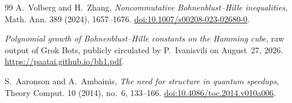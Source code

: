 \documentclass[11pt]{amsart}
\theoremstyle{remark}
\numberwithin{equation}{section}
\begin{document}
\begin{thebibliography}{99}
A.~Volberg and H.~Zhang,
\emph{Noncommutative Bohnenblust--Hille inequalities},
Math. Ann. 389 (2024), 1657--1676.
\href{https://doi.org/10.1007/s00208-023-02680-0}{doi:10.1007/s00208-023-02680-0}.

\emph{Polynomial growth of Bohnenblust--Hille constants on the Hamming cube},
raw output of Grok Bots, publicly circulated by P.~Ivanisvili on
August~27, 2026.
\url{https://paatai.github.io/bh1.pdf}.

S.~Aaronson and A.~Ambainis,
\emph{The need for structure in quantum speedups},
Theory Comput. 10 (2014), no.~6, 133--166.
\href{https://doi.org/10.4086/toc.2014.v010a006}{doi:10.4086/toc.2014.v010a006}.

\end{thebibliography}
\end{document}
